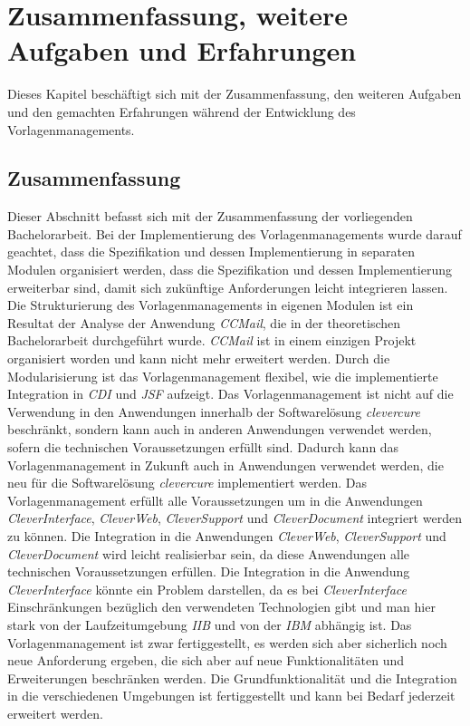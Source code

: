 \chapter{Zusammenfassung, weitere Aufgaben und Erfahrungen}
\label{cha:Zusammenfassung}
Dieses Kapitel beschäftigt sich mit der Zusammenfassung, den weiteren Aufgaben und den gemachten Erfahrungen während der Entwicklung des Vorlagenmanagements. 
\section{Zusammenfassung}
Dieser Abschnitt befasst sich mit der Zusammenfassung der vorliegenden  Bachelorarbeit.
\newline
\newline
Bei der Implementierung des Vorlagenmanagements wurde darauf geachtet, dass die Spezifikation und dessen Implementierung in separaten Modulen organisiert werden, dass die Spezifikation und dessen Implementierung erweiterbar sind, damit sich zukünftige Anforderungen leicht integrieren lassen. Die Strukturierung des Vorlagenmanagements  in eigenen Modulen ist ein Resultat der Analyse der Anwendung \emph{CCMail}, die in der theoretischen Bachelorarbeit durchgeführt wurde. \emph{CCMail} ist in einem einzigen Projekt organisiert worden und kann nicht mehr erweitert werden. Durch die Modularisierung ist das Vorlagenmanagement flexibel, wie die implementierte Integration in \emph{CDI} und \emph{JSF} aufzeigt.
\newline
\newline
Das Vorlagenmanagement ist nicht auf die Verwendung in den Anwendungen innerhalb der Softwarelösung \emph{clevercure} beschränkt, sondern kann auch in anderen Anwendungen verwendet werden, sofern die technischen Voraussetzungen erfüllt sind. Dadurch kann das Vorlagenmanagement in Zukunft auch in Anwendungen verwendet werden, die neu für die Softwarelösung \emph{clevercure} implementiert werden.
\newline
\newline
Das Vorlagenmanagement erfüllt alle Voraussetzungen um in die Anwendungen \emph{CleverInterface}, \emph{CleverWeb}, \emph{CleverSupport} und \emph{CleverDocument} integriert werden zu können. Die Integration in die Anwendungen \emph{CleverWeb}, \emph{CleverSupport} und \emph{CleverDocument} wird  leicht realisierbar sein, da diese Anwendungen alle technischen Voraussetzungen  erfüllen. Die Integration in die Anwendung \emph{CleverInterface} könnte ein Problem darstellen, da es bei \emph{CleverInterface} Einschränkungen bezüglich den verwendeten Technologien gibt und man hier stark von der Laufzeitumgebung \emph{IIB} und von der \emph{IBM} abhängig ist.  
\newline
\newline
Das Vorlagenmanagement ist zwar fertiggestellt, es werden sich aber sicherlich noch neue Anforderung ergeben, die sich aber auf neue Funktionalitäten und Erweiterungen beschränken werden. Die Grundfunktionalität und die Integration in die verschiedenen Umgebungen ist fertiggestellt und kann bei Bedarf jederzeit erweitert werden.

